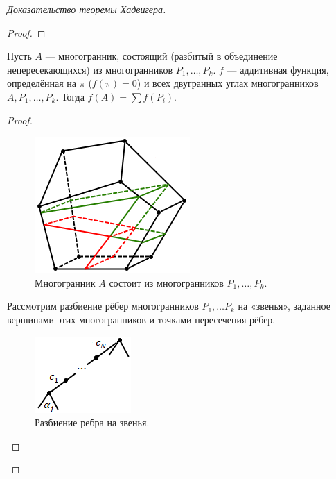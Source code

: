 \begin{proof}[Доказательство теоремы Хадвигера]
\begin{proof}
\end{proof}

\begin{lemma}[2]
    Пусть $A$ — многогранник, состоящий (разбитый в объединение непересекающихся) из многогранников $P_1, \dots, P_k$. $f$ — аддитивная функция, определённая на $\pi$ ($f(\pi) = 0$) и всех двугранных углах многогранников $A,P_1, \dots, P_k$. Тогда $f(A) = \sum f(P_i)$.
\end{lemma}
\begin{proof}
    \begin{figure}[htbp]
        \centering
        \includegraphics[scale=0.7]{images/c8.4.png}
        \caption{Многогранник $A$ состоит из многогранников $P_1, \dots, P_k$.}
        \label{fig:c8.4}
    \end{figure}

    Рассмотрим разбиение рёбер многогранников $P_1, \dots P_k$ на «звенья», заданное вершинами этих многогранников и точками пересечения рёбер.

    \begin{figure}[htbp]
        \centering
        \includegraphics[scale=0.7]{images/c8.5.png}
        \caption{Разбиение ребра на звенья.}
        \label{fig:c8.5}
    \end{figure}


\end{proof}
\end{proof}
